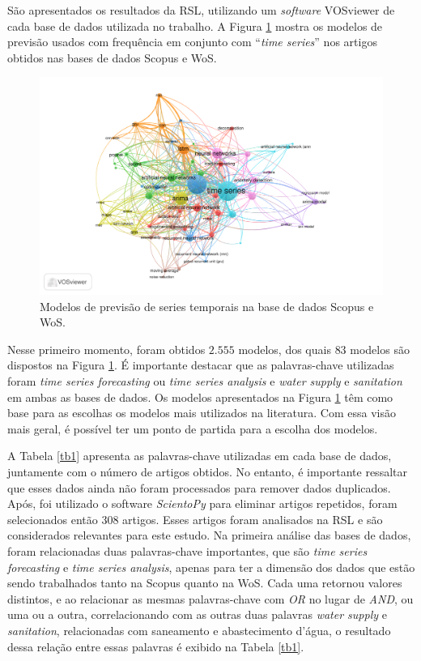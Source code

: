 São apresentados os resultados da RSL, utilizando um \textit{software} VOSviewer de cada base de dados utilizada no trabalho. 
A Figura \ref{fig:scopus-09-08} mostra os modelos de previsão usados com frequência em conjunto com ``\textit{time series}'' nos artigos obtidos nas bases de dados Scopus e WoS. 

\begin{figure}[!htb]
	\centering
	\caption{Modelos de previsão de series temporais na base de dados Scopus e WoS.}
	\label{fig:scopus-09-08}
	\includegraphics[width=\linewidth]{Revisao/Figuras/base-wos-scopus.pdf}
	
	
\end{figure}

Nesse primeiro momento, foram obtidos $2.555$ modelos, dos quais $83$ modelos são dispostos na Figura \ref{fig:scopus-09-08}. É importante destacar que as palavras-chave utilizadas foram \textit{time series forecasting} ou \textit{time series analysis} e \textit{water supply} e \textit{sanitation} em ambas as bases de dados. Os modelos apresentados na Figura \ref{fig:scopus-09-08} têm como base para as escolhas os modelos mais utilizados na literatura. Com essa visão mais geral, é possível ter um ponto de partida para a escolha dos modelos.

A Tabela \ref{tb1} apresenta as palavras-chave utilizadas em cada base de dados, juntamente com o número de artigos obtidos. No entanto, é importante ressaltar que esses dados ainda não foram processados para remover dados duplicados. Após, foi utilizado o software \textit{ScientoPy} para eliminar artigos repetidos, foram selecionados então $308$ artigos. Esses artigos foram analisados na RSL e são considerados relevantes para este estudo. Na primeira análise das bases de dados, foram relacionadas duas palavras-chave importantes, que são \textit{time series forecasting} e \textit{time series analysis}, apenas para ter a dimensão dos dados que estão sendo trabalhados tanto na Scopus quanto na WoS. Cada uma retornou valores distintos, e ao relacionar as mesmas palavras-chave com \textit{OR} no lugar de \textit{AND}, ou uma ou a outra, correlacionando com as outras duas palavras \textit{water supply} e \textit{sanitation}, relacionadas com saneamento e abastecimento d'água, o resultado dessa relação entre essas palavras é exibido na Tabela \ref{tb1}.

